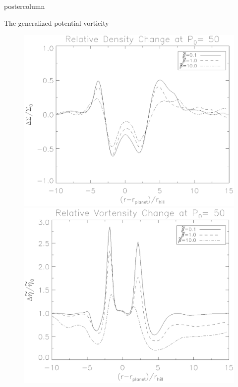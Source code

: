 \documentclass[final,hyperref={pdfpagelabels=false}]{beamer}
\begin{document}
\begin{frame}
\begin{columns}
\begin{column}{.49\textwidth}
\begin{beamercolorbox}[center,wd=\textwidth]{postercolumn}
\begin{minipage}[T]{.95\textwidth}
{\begin{block}{{\Large The generalized potential vorticity}}
                  \begin{figure}
                    \centering
                    \hfill
                    \begin{minipage}{0.49\textwidth}
                      \includegraphics[width=\textwidth]{Posterfig_Density}
                    \end{minipage}
                    \hfill
                    \begin{minipage}{0.49\textwidth}
                      \includegraphics[width=\textwidth]{Posterfig_Vortensity}
                    \end{minipage}
                    \hfill
                  \end{figure}


\end{block}}
\end{minipage}
\end{beamercolorbox}
\end{column}
\end{columns}
\end{frame}
\end{document}
